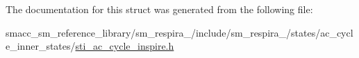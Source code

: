 The documentation for this struct was generated from the following file\+:\begin{DoxyCompactItemize}
\item 
smacc\+\_\+sm\+\_\+reference\+\_\+library/sm\+\_\+respira\+\_/include/sm\+\_\+respira\+\_/states/ac\+\_\+cycle\+\_\+inner\+\_\+states/\hyperlink{sti__ac__cycle__inspire_8h}{sti\+\_\+ac\+\_\+cycle\+\_\+inspire.\+h}\end{DoxyCompactItemize}
